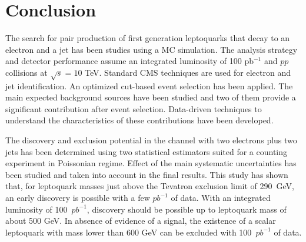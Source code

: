 %

\section{Conclusion}

The search for pair production of first generation leptoquarks that decay to
an electron and a jet has been studies using a MC simulation.
The analysis strategy and detector performance assume an integrated luminosity of 100 pb$^{-1}$ and $pp$ collisions 
at $\sqrt{s}=10$ TeV.
Standard CMS techniques are used for electron and jet identification. 
An optimized cut-based event selection has been applied.
The main expected background sources have been studied and two of them provide 
a significant contribution after event selection. 
Data-driven techniques to understand the characteristics of these contributions have been developed.

The discovery and exclusion potential in the channel with two electrons plus two jets has 
been determined using two statistical estimators suited for a counting experiment in Poissonian regime.
Effect of the main systematic uncertainties has been studied and taken into account in the final 
results. This study has shown that, 
for leptoquark masses just above the Tevatron exclusion limit of 290~GeV, 
an early discovery is possible with a few $pb^{-1}$ of data.
With an integrated luminosity of 100~$pb^{-1}$, discovery should be possible up
to leptoquark mass of about 500 GeV.
In absence of evidence of a signal, the existence of a scalar leptoquark 
with mass lower than 600 GeV can be excluded with 100~$pb^{-1}$ of data.






%
